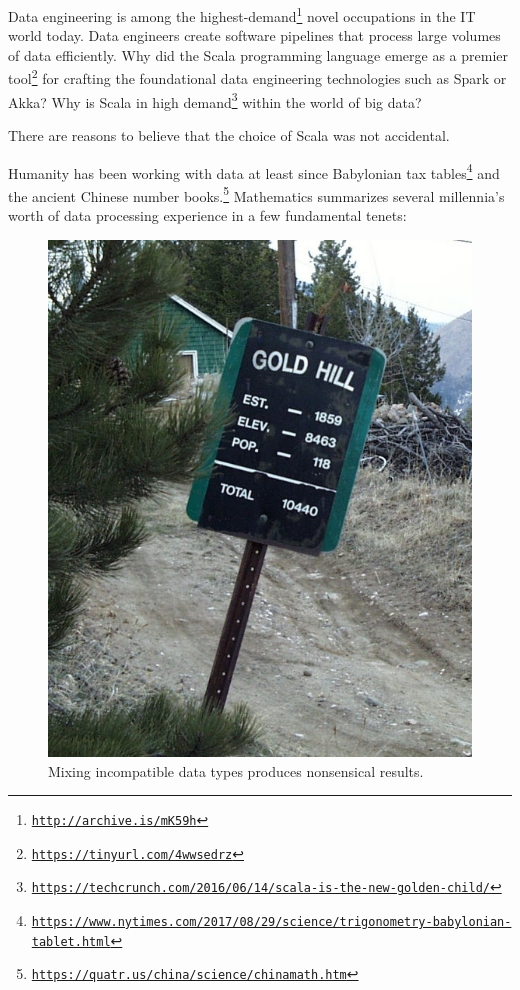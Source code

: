 

Data engineering is among the highest-demand\footnote{\texttt{\href{http://archive.is/mK59h}{http://archive.is/mK59h}}}
novel occupations in the IT world today. Data engineers create software
pipelines that process large volumes of data efficiently. Why did
the Scala programming language emerge as a premier tool\footnote{\texttt{\href{https://www.slideshare.net/noootsab/scala-the-unpredicted-lingua-franca-for-data-science}{https://tinyurl.com/4wwsedrz}}}
for crafting the foundational data engineering technologies such as
Spark or Akka? Why is Scala in high demand\footnote{\texttt{\href{https://techcrunch.com/2016/06/14/scala-is-the-new-golden-child/}{https://techcrunch.com/2016/06/14/scala-is-the-new-golden-child/}}}
within the world of big data?

There are reasons to believe that the choice of Scala was not accidental.


Humanity has been working with data at least since Babylonian tax
tables\footnote{\texttt{\href{https://www.nytimes.com/2017/08/29/science/trigonometry-babylonian-tablet.html}{https://www.nytimes.com/2017/08/29/science/trigonometry-babylonian-tablet.html}}}
and the ancient Chinese number books.\footnote{\texttt{\href{https://web.archive.org/web/20170425233550/https://quatr.us/china/science/chinamath.htm}{https://quatr.us/china/science/chinamath.htm}}}
Mathematics summarizes several millennia\textsf{'}s worth of data processing
experience in a few fundamental tenets:

\begin{figure}
\begin{centering}
\includegraphics[width=0.4\linewidth]{type-error}\vspace{-0.5\baselineskip}
\par\end{centering}
\caption{Mixing incompatible data types produces nonsensical
results.\label{fig:A-nonsensical-calculation-1}}

\end{figure}

